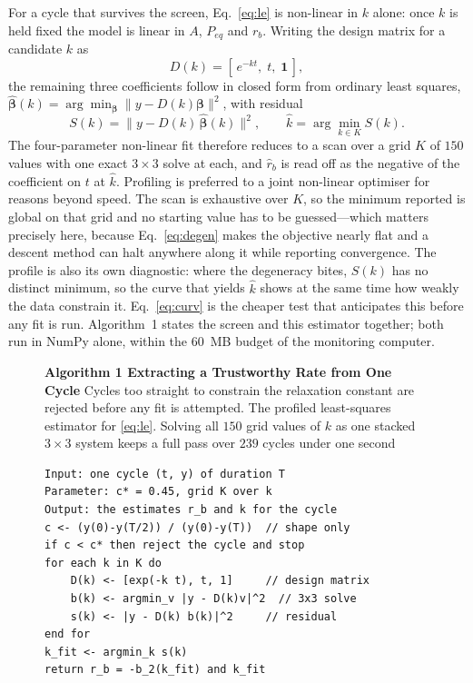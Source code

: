 \documentclass[runningheads]{llncs}
\newcommand{\rb}{\ensuremath{r_{b}}}
\newcommand{\rbh}{\ensuremath{\hat{r}_{b}}}
\begin{document}
For a cycle that survives the screen, Eq.~\eqref{eq:le} is non-linear
in $k$ alone: once $k$ is held fixed the model is linear in $A$,
$P_{eq}$ and \rb{}. Writing the design matrix for a candidate $k$ as
\begin{equation}
D(k)=\left[\,e^{-kt},\; t,\; \mathbf{1}\,\right] ,
\label{eq:design}
\end{equation}
the remaining three coefficients follow in closed form from ordinary
least squares, $\hat{\boldsymbol\beta}(k)=\arg\min_{\boldsymbol\beta}
\lVert y-D(k)\boldsymbol\beta\rVert^{2}$, with residual
\begin{equation}
S(k)=\bigl\lVert y-D(k)\,\hat{\boldsymbol\beta}(k)\bigr\rVert^{2} ,
\qquad
\hat{k}=\arg\min_{k\in K} S(k) .
\label{eq:profile}
\end{equation}
The four-parameter non-linear fit therefore reduces to a scan over a
grid $K$ of $150$ values with one exact $3\times3$ solve at each,
and \rbh{} is read off as the negative of the coefficient on $t$ at
$\hat{k}$. Profiling is preferred to a joint non-linear optimiser for
reasons beyond speed. The scan is exhaustive over $K$, so the minimum
reported is global on that grid and no starting value has to be
guessed---which matters precisely here, because
Eq.~\eqref{eq:degen} makes the objective nearly flat and a descent
method can halt anywhere along it while reporting convergence. The
profile is also its own diagnostic: where the degeneracy bites, $S(k)$
has no distinct minimum, so the curve that yields $\hat{k}$ shows at
the same time how weakly the data constrain it.
Eq.~\eqref{eq:curv} is the cheaper test that anticipates this before
any fit is run. Algorithm~1 states the screen and this estimator together;
both run in NumPy alone, within the $60$~MB budget of the monitoring
computer.

\begin{figure}[t]
\noindent\textbf{Algorithm 1  Extracting a Trustworthy Rate from One Cycle} Cycles too straight to constrain the relaxation constant are rejected before any fit is attempted. The profiled
least-squares estimator for \eqref{eq:le}. Solving all $150$ grid
values of $k$ as one stacked $3\times3$ system keeps a full pass over
$239$ cycles under one second

\begin{verbatim}
Input: one cycle (t, y) of duration T
Parameter: c* = 0.45, grid K over k
Output: the estimates r_b and k for the cycle
c <- (y(0)-y(T/2)) / (y(0)-y(T))  // shape only
if c < c* then reject the cycle and stop
for each k in K do
    D(k) <- [exp(-k t), t, 1]     // design matrix
    b(k) <- argmin_v |y - D(k)v|^2  // 3x3 solve
    s(k) <- |y - D(k) b(k)|^2     // residual
end for
k_fit <- argmin_k s(k)
return r_b = -b_2(k_fit) and k_fit
\end{verbatim}

\end{figure}
\end{document}
